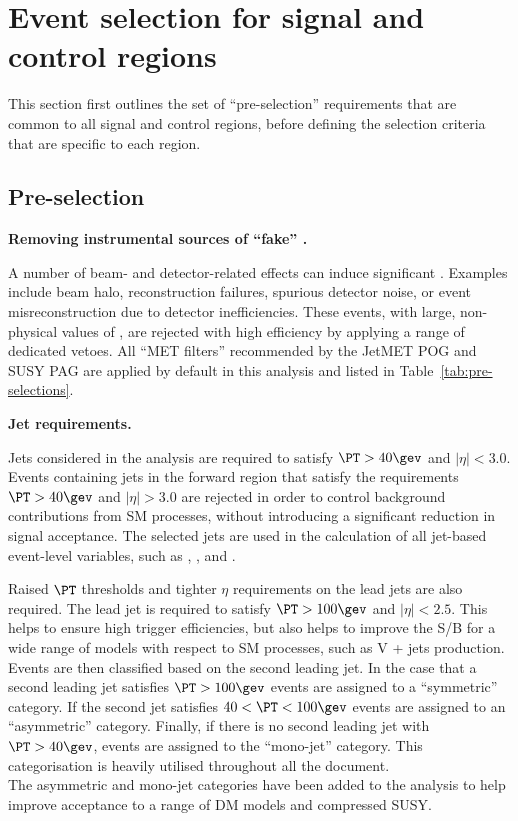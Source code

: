 \section{Event selection for signal and control regions}
\label{sec:selection}

This section first outlines the set of ``pre-selection'' requirements
that are common to all signal and control regions, before defining the
selection criteria that are specific to each region.

\subsection{Pre-selection}
\label{sec:preSelection}

{\bf Removing instrumental sources of ``fake'' \met.} 

A number of beam- and detector-related effects can induce significant
\met. Examples include beam halo, reconstruction failures, spurious
detector noise, or event misreconstruction due to detector
inefficiencies. These events, with large, non-physical values of \met,
are rejected with high efficiency by applying a range of dedicated
vetoes. All ``MET filters'' recommended by the JetMET POG and SUSY PAG
are applied by default in this analysis and listed in Table~\ref{tab:pre-selections}.

{\bf Jet requirements.} 

Jets considered in the analysis are required to satisfy $\PT>40\gev$
and $|\eta|<3.0$. Events containing jets in the forward region that
satisfy the requirements $\PT>40\gev$ and $|\eta|>3.0$ are rejected in
order to control background contributions from SM processes, without
introducing a significant reduction in signal acceptance. The selected jets
 are used in the calculation of all jet-based
event-level variables, such as \HT, \mht, and \alphat.

Raised $\PT$ thresholds and tighter $\eta$ requirements on the lead jets 
are also required. The lead jet is required to satisfy $\PT > 100\gev$
and $|\eta|<2.5$. This helps to ensure high trigger efficiencies,
but also helps to improve the S/B for a wide
range of models with respect to SM processes, such as V + jets
production. Events are then classified based on the
second leading jet. In the case that a second leading jet satisfies $\PT > 100\gev$ 
events are assigned to a ``symmetric'' \njet category. If the second
jet satisfies $40 < \PT < 100\gev$ events are assigned to an
``asymmetric'' \njet category. Finally, if there is no second leading
jet with $\PT>40\gev$, events are assigned to the ``mono-jet''
category. This categorisation is heavily utilised throughout all the document. \\
The asymmetric and mono-jet categories have been added to
the analysis to help improve acceptance to a range of DM models and compressed
SUSY.

